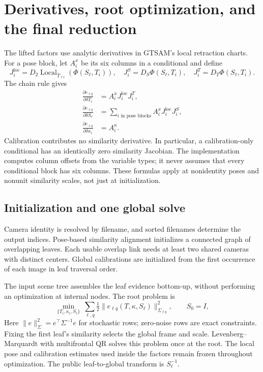 \documentclass[11pt,letterpaper]{article}
\newcommand{\Local}{\operatorname{Local}}
\begin{document}
\newpage
\section{Derivatives, root optimization, and the final reduction}
The lifted factors use analytic derivatives in GTSAM's local retraction charts.
For a pose block, let $A_i^x$ be its six columns in a conditional and define
\begin{equation}
 J_i^{\mathrm{loc}}=D_2\Local_{\bar T_{\ell i}}(\Phi(S_\ell,T_i)),\quad
 J_i^S=D_S\Phi(S_\ell,T_i),\quad J_i^T=D_T\Phi(S_\ell,T_i).
\end{equation}
The chain rule gives
\begin{align}
 \frac{\partial e_{\ell q}}{\partial \delta T_i}
   &=A_i^xJ_i^{\mathrm{loc}}J_i^T,\\
 \frac{\partial e_{\ell q}}{\partial \delta S_\ell}
   &=\sum_{i\text{ in pose blocks}}A_i^xJ_i^{\mathrm{loc}}J_i^S,\\
 \frac{\partial e_{\ell q}}{\partial \delta\kappa_i}
   &=A_i^\kappa.
\end{align}
Calibration contributes no similarity derivative. In particular, a
calibration-only conditional has an identically zero similarity Jacobian.
The implementation computes column offsets from the variable types; it never
assumes that every conditional block has six columns. These formulas apply at
nonidentity poses and nonunit similarity scales, not just at initialization.

\subsection{Initialization and one global solve}
Camera identity is resolved by filename, and sorted filenames determine the
output indices. Pose-based similarity alignment initializes a connected graph of
overlapping leaves. Each usable overlap link needs at least two shared cameras
with distinct centers. Global calibrations are initialized from the first
occurrence of each image in leaf traversal order.

The input scene tree assembles the leaf evidence bottom-up, without performing
an optimization at internal nodes. The root problem is
\begin{equation}\label{eq:root}
 \min_{\{T_i,\kappa_i,S_\ell\}}\ \sum_{\ell,q}
   \tfrac12\|e_{\ell q}(T,\kappa,S_\ell)\|_{\Sigma_{\ell q}}^2,
 \qquad S_0=I,
\end{equation}
Here $\|e\|_\Sigma^2=e^\top\Sigma^{-1}e$ for stochastic rows; zero-noise rows
are exact constraints. Fixing the first leaf's similarity selects the global frame and
scale. Levenberg--Marquardt with multifrontal QR solves this problem once at the
root. The local pose and calibration estimates used inside the factors remain
frozen throughout optimization. The public leaf-to-global transform is
$S_\ell^{-1}$.
\end{document}
